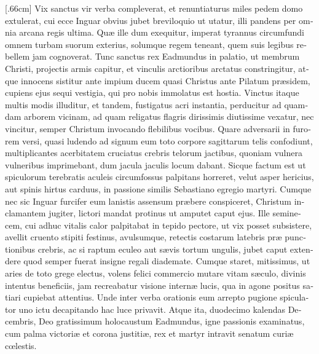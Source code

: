 \documentclass[10pt]{book}
\begin{document}
\begin{paracol}{2}

\begin{otherlanguage}{latin}
\reversemarginpar
{}[.66cm]
Vix sanctus vir verba compleverat, et renuntiaturus miles pedem domo extulerat, cui ecce Inguar obvius jubet breviloquio ut utatur, illi pandens per omnia arcana regis ultima. Qu\ae{} ille dum exequitur, imperat tyrannus circumfundi omnem turbam suorum exterius, solumque regem teneant, quem suis legibus rebellem jam cognoverat. Tunc sanctus rex Eadmundus in palatio, ut membrum Christi, projectis armis capitur, et vinculis arctioribus arctatus constringitur, atque innocens sistitur ante impium ducem quasi Christus ante Pilatum pr\ae{}sidem, cupiens ejus sequi vestigia, qui pro nobis immolatus est hostia. Vinctus itaque multis modis illuditur, et tandem, fustigatus acri instantia, perducitur ad quamdam arborem vicinam, ad quam religatus flagris dirissimis diutissime vexatur, nec vincitur, semper Christum invocando flebilibus vocibus. Quare adversarii in furorem versi, quasi ludendo ad signum eum toto corpore sagittarum telis confodiunt, multiplicantes acerbitatem cruciatus crebris telorum jactibus, quoniam vulnera vulneribus imprimebant, dum jacula jaculis locum dabant. Sicque factum est ut spiculorum terebratis aculeis circumfossus palpitans horreret, velut asper hericius, aut spinis hirtus carduus, in passione similis Sebastiano egregio martyri. Cumque nec sic Inguar furcifer eum lanistis assensum pr\ae{}bere conspiceret, Christum inclamantem jugiter, lictori mandat protinus ut amputet caput ejus. Ille seminecem, cui adhuc vitalis calor palpitabat in tepido pectore, ut vix posset subsistere, avellit cruento stipiti festinus, avulsumque, retectis costarum latebris pr\ae{} punctionibus crebris, ac si raptum eculeo aut s\ae{}vis tortum ungulis, jubet caput extendere quod semper fuerat insigne regali diademate. Cumque staret, mitissimus, ut aries de toto grege electus, volens felici commercio mutare vitam s\ae{}culo, divinis intentus beneficiis, jam recreabatur visione intern\ae{} lucis, qua in agone positus satiari cupiebat attentius. Unde inter verba orationis eum arrepto pugione spiculator uno ictu decapitando hac luce privavit. Atque ita, duodecimo kalendas Decembris, Deo gratissimum holocaustum Eadmundus, igne passionis examinatus, cum palma victori\ae{} et corona justiti\ae{}, rex et martyr intravit senatum curi\ae{} c\oe{}lestis.
\end{otherlanguage}

\switchcolumn


\end{paracol}
\end{document}
